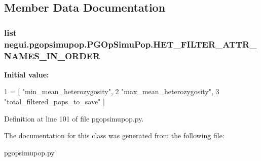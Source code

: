 \subsection{Member Data Documentation}
\subsubsection[{\texorpdfstring{H\+E\+T\+\_\+\+F\+I\+L\+T\+E\+R\+\_\+\+A\+T\+T\+R\+\_\+\+N\+A\+M\+E\+S\+\_\+\+I\+N\+\_\+\+O\+R\+D\+ER}{HET_FILTER_ATTR_NAMES_IN_ORDER}}]{\setlength{\rightskip}{0pt plus 5cm}list negui.\+pgopsimupop.\+P\+G\+Op\+Simu\+Pop.\+H\+E\+T\+\_\+\+F\+I\+L\+T\+E\+R\+\_\+\+A\+T\+T\+R\+\_\+\+N\+A\+M\+E\+S\+\_\+\+I\+N\+\_\+\+O\+R\+D\+ER\hspace{0.3cm}{\ttfamily [static]}}\hypertarget{classnegui_1_1pgopsimupop_1_1PGOpSimuPop_ab8c25d28c8e179a0bc08219841ccd7f5}{}\label{classnegui_1_1pgopsimupop_1_1PGOpSimuPop_ab8c25d28c8e179a0bc08219841ccd7f5}
{\bfseries Initial value\+:}
\begin{DoxyCode}
1 = [ \textcolor{stringliteral}{"min\_mean\_heterozygosity"}, 
2                                         \textcolor{stringliteral}{"max\_mean\_heterozygosity"},
3                                         \textcolor{stringliteral}{"total\_filtered\_pops\_to\_save"} ]
\end{DoxyCode}


Definition at line 101 of file pgopsimupop.\+py.



The documentation for this class was generated from the following file\+:\begin{DoxyCompactItemize}
\item 
pgopsimupop.\+py\end{DoxyCompactItemize}
